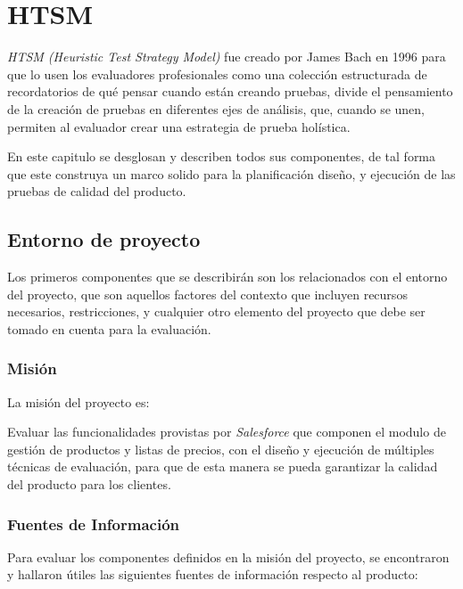 \chapter{HTSM}

\emph{HTSM (Heuristic Test Strategy Model)} fue creado por James Bach en 1996
para que lo usen los evaluadores profesionales como una colección estructurada
de recordatorios de qué pensar cuando están creando pruebas, divide el
pensamiento de la creación de pruebas en diferentes ejes de análisis, que,
cuando se unen, permiten al evaluador crear una estrategia de prueba
holística\cite{Bach}.

En este capitulo se desglosan y describen todos sus componentes, de tal
forma que este construya un marco solido para la planificación diseño, y
ejecución de las pruebas de calidad del producto.

\section{Entorno de proyecto}
Los primeros componentes que se describirán son los relacionados con el entorno
del proyecto, que son aquellos factores del contexto que incluyen recursos
necesarios, restricciones, y cualquier otro elemento del proyecto que debe ser
tomado en cuenta para la evaluación.

\subsection{Misión}
La misión del proyecto es:

Evaluar las funcionalidades provistas por \emph{Salesforce} que componen el
modulo de gestión de productos y listas de precios, con el diseño y ejecución de
múltiples técnicas de evaluación, para que de esta manera se pueda garantizar la
calidad del producto para los clientes.

\subsection{Fuentes de Información}
Para evaluar los componentes definidos en la misión del proyecto, se encontraron
y hallaron útiles las siguientes fuentes de información respecto al producto:

